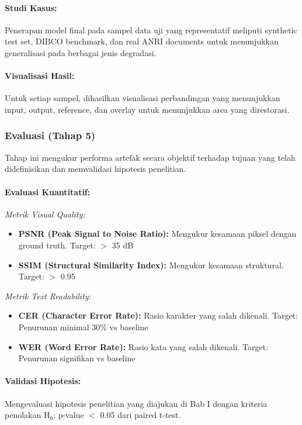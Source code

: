 \documentclass[12pt,a4paper]{article}
\begin{document}
\paragraph{Studi Kasus:}
Penerapan model final pada sampel data uji yang representatif meliputi synthetic test set, DIBCO benchmark, dan real ANRI documents untuk menunjukkan generalisasi pada berbagai jenis degradasi.

\paragraph{Visualisasi Hasil:}
Untuk setiap sampel, dihasilkan visualisasi perbandingan yang menunjukkan input, output, reference, dan overlay untuk menunjukkan area yang direstorasi.

\subsubsection{Evaluasi (Tahap 5)}
Tahap ini mengukur performa artefak secara objektif terhadap tujuan yang telah didefinisikan dan memvalidasi hipotesis penelitian.

\paragraph{Evaluasi Kuantitatif:}

\textit{Metrik Visual Quality:}
\begin{itemize}[leftmargin=*, nosep]
\item \textbf{PSNR (Peak Signal to Noise Ratio):} Mengukur kesamaan piksel dengan ground truth. Target: $>$ 35 dB
\item \textbf{SSIM (Structural Similarity Index):} Mengukur kesamaan struktural. Target: $>$ 0.95
\end{itemize}

\textit{Metrik Text Readability:}
\begin{itemize}[leftmargin=*, nosep]
\item \textbf{CER (Character Error Rate):} Rasio karakter yang salah dikenali. Target: Penurunan minimal 30\% vs baseline
\item \textbf{WER (Word Error Rate):} Rasio kata yang salah dikenali. Target: Penurunan signifikan vs baseline
\end{itemize}

\paragraph{Validasi Hipotesis:}
Mengevaluasi hipotesis penelitian yang diajukan di Bab I dengan kriteria penolakan H$_0$: p-value $<$ 0.05 dari paired t-test.
\end{document}
